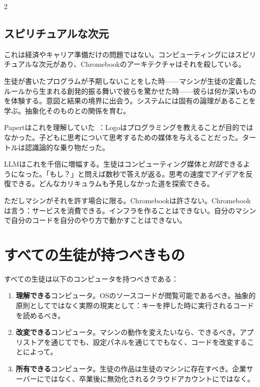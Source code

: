 \documentclass[11pt, a4paper]{article}
\begin{document}
\begin{multicols}{2}
\subsection{スピリチュアルな次元}

これは経済やキャリア準備だけの問題ではない。コンピューティングにはスピリチュアルな次元があり、Chromebookのアーキテクチャはそれを殺している。

生徒が書いたプログラムが予期しないことをした時——マシンが生徒の定義したルールから生まれる創発的振る舞いで彼らを驚かせた時——彼らは何か深いものを体験する。意図と結果の境界に出会う。システムには固有の論理があることを学ぶ。抽象化そのものとの関係を育む。

Papertはこれを理解していた~\citep{papert1980mindstorms}：Logoはプログラミングを教えることが目的ではなかった。子どもに思考について思考するための媒体を与えることだった。タートルは認識論的な乗り物だった。

LLMはこれを千倍に増幅する。生徒はコンピューティング媒体と\emph{対話}できるようになった。「もし？」と問えば数秒で答えが返る。思考の速度でアイデアを反復できる。どんなカリキュラムも予見しなかった道を探索できる。

ただしマシンがそれを許す場合に限る。Chromebookは許さない。Chromebookは言う：サービスを消費できる。インフラを作ることはできない。自分のマシンで自分のコードを自分のやり方で動かすことはできない。


\section{すべての生徒が持つべきもの}

すべての生徒は以下のコンピュータを持つべきである：

\begin{enumerate}
  \item \textbf{理解できる}コンピュータ。OSのソースコードが閲覧可能であるべき。抽象的原則としてではなく実際の現実として：キーを押した時に実行されるコードを読めるべき。

  \item \textbf{改変できる}コンピュータ。マシンの動作を変えたいなら、できるべき。アプリストアを通じてでも、設定パネルを通じてでもなく、コードを改変することによって。

  \item \textbf{所有できる}コンピュータ。生徒の作品は生徒のマシンに存在すべき。企業サーバーにではなく、卒業後に無効化されるクラウドアカウントにではなく。


\end{enumerate}
\end{multicols}
\end{document}
